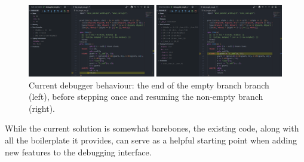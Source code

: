 \begin{figure}
  \center{}
  \includegraphics[width=\textwidth]{img/debug-step-current.png}
  \caption{
    Current debugger behaviour: the end of the empty branch branch (left),
    before stepping once and resuming the non-empty branch (right).}%
  \label{fig:debug-step-current}
\end{figure}

While the current solution is somewhat barebones, the existing code, along with
all the boilerplate it provides, can serve as a helpful starting point when
adding new features to the debugging interface.

